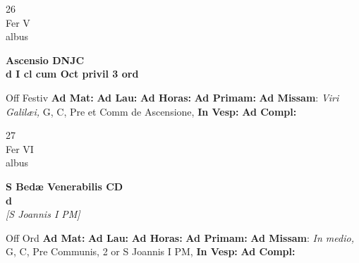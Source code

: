 \documentclass[10pt, openany]{book}
\begin{document}
    \begin{center}
        \begin{minipage}{3.5in}
            \vspace{2em}
            \begin{minipage}{0.5in}
                {\Huge 26} \\
                {\normalsize Fer V} \\
                {\normalsize albus}
            \end{minipage}
            \begin{minipage}{3.0in}
                \textbf{ \large Ascensio DNJC \\
                \textnormal{\normalsize d I cl cum Oct privil 3 ord}} \\ 
            \end{minipage}
            \begin{justify}Off Festiv
                \textbf{Ad Mat: }
                \textbf{Ad Lau: }
                \textbf{Ad Horas: }
                \textbf{Ad Primam: }\textbf{Ad Missam}: \textit{Viri Galilæi,} G, C, Pre et Comm de Ascensione,  
                \textbf{In Vesp: }
                \textbf{Ad Compl: }
            \end{justify}
        \end{minipage}
    \end{center}

    \begin{center}
        \begin{minipage}{3.5in}
            \vspace{2em}
            \begin{minipage}{0.5in}
                {\Huge 27} \\
                {\normalsize Fer VI} \\
                {\normalsize albus}
            \end{minipage}
            \begin{minipage}{3.0in}
                \textbf{ \large S Bedæ Venerabilis CD \\
                \textnormal{\normalsize d}} \\ \textit{[S Joannis I PM]} \\ 
            \end{minipage}
            \begin{justify}Off Ord
                \textbf{Ad Mat: }
                \textbf{Ad Lau: }
                \textbf{Ad Horas: }
                \textbf{Ad Primam: }\textbf{Ad Missam}: \textit{In medio,} G, C, Pre Communis, 2 or S Joannis I PM,  
                \textbf{In Vesp: }
                \textbf{Ad Compl: }
            \end{justify}
        \end{minipage}
    \end{center}
\end{document}
